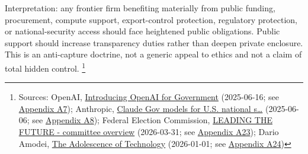 \documentclass[
  american,
  11pt,
  letterpaper,
]{article}
\begin{document}
Interpretation: any frontier firm benefiting materially from public
funding, procurement, compute support, export-control protection,
regulatory protection, or national-security access should face
heightened public obligations. Public support should increase
transparency duties rather than deepen private enclosure. This is an
anti-capture doctrine, not a generic appeal to ethics and not a claim of
total hidden control. \footnote{Sources: OpenAI,
  \href{https://openai.com/global-affairs/introducing-openai-for-government/}{Introducing
  OpenAI for Government} (2025-06-16; see
  \hyperref[ch-10-appendix-a7-introducing-openai-for-government]{Appendix
  A7}); Anthropic,
  \href{https://www.anthropic.com/news/claude-gov-models-for-u-s-national-security-customers}{Claude
  Gov models for U.S. national s\ldots{}} (2025-06-06; see
  \hyperref[ch-10-appendix-a8-claude-gov-models-for-u-s-national-security-customers]{Appendix
  A8}); Federal Election Commission,
  \href{https://www.fec.gov/data/committee/C00916114/}{LEADING THE
  FUTURE - committee overview} (2026-03-31; see
  \hyperref[ch-10-appendix-a23-leading-the-future-committee-overview]{Appendix
  A23}); Dario Amodei,
  \href{https://darioamodei.com/essay/the-adolescence-of-technology}{The
  Adolescence of Technology} (2026-01-01; see
  \hyperref[ch-10-appendix-a24-the-adolescence-of-technology]{Appendix
  A24})}
\end{document}
